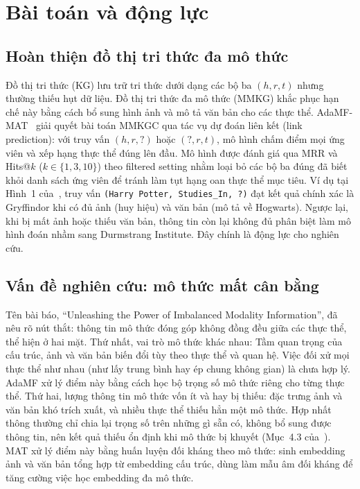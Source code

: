 \documentclass[conference]{IEEEtran}
\renewcommand{\hl}[1]{#1}
\renewcommand{\colorbox}[2]{#2}
\begin{document}
\section{Bài toán và động lực}
\label{sec:adamf-problem}

\subsection{Hoàn thiện đồ thị tri thức đa mô thức}
\hl{Đồ thị tri thức (KG) lưu trữ tri thức dưới dạng các bộ ba} \colorbox{yellow}{$(h, r, t)$}
\hl{nhưng thường thiếu hụt dữ liệu. Đồ thị tri thức đa mô thức (MMKG) khắc phục hạn chế này bằng cách bổ sung
hình ảnh và mô tả văn bản cho các thực thể. AdaMF-MAT}\colorbox{yellow}{~\cite{adamfmat}}\hl{ giải quyết bài toán
MMKGC qua tác vụ dự đoán liên kết (link prediction): với truy vấn} \colorbox{yellow}{$(h, r, ?)$} \hl{hoặc}
\colorbox{yellow}{$(?, r, t)$}\hl{, mô hình chấm điểm mọi ứng viên và xếp hạng thực thể đúng lên đầu. Mô hình được
đánh giá qua MRR và Hits@}\colorbox{yellow}{$k$} \hl{(}\colorbox{yellow}{$k \in \{1, 3, 10\}$}\hl{) theo filtered
setting nhằm loại bỏ các bộ ba đúng đã biết khỏi danh sách ứng viên để tránh làm tụt hạng oan thực thể mục tiêu.
Ví dụ tại Hình~1 của}\colorbox{yellow}{~\cite{adamfmat}}\hl{, truy vấn}
\colorbox{yellow}{\texttt{(Harry Potter, Studies\_In, ?)}}
\hl{đạt kết quả chính xác là Gryffindor khi có đủ ảnh (huy hiệu) và văn bản (mô tả về Hogwarts). Ngược lại, khi bị
mất ảnh hoặc thiếu văn bản, thông tin còn lại không đủ phân biệt làm mô hình đoán nhầm sang Durmstrang Institute.
Đây chính là động lực cho nghiên cứu.}

\subsection{Vấn đề nghiên cứu: mô thức mất cân bằng}
\hl{Tên bài báo, ``Unleashing the Power of Imbalanced Modality Information'', đã nêu rõ nút thắt: thông tin mô thức
đóng góp không đồng đều giữa các thực thể, thể hiện ở hai mặt. Thứ nhất, vai trò mô thức khác nhau: Tầm quan trọng
của cấu trúc, ảnh và văn bản biến đổi tùy theo thực thể và quan hệ. Việc đối xử mọi thực thể như nhau (như lấy
trung bình hay ép chung không gian) là chưa hợp lý. AdaMF xử lý điểm này bằng cách học bộ trọng số mô thức riêng
cho từng thực thể. Thứ hai, lượng thông tin mô thức vốn ít và hay bị thiếu: đặc trưng ảnh và văn bản khó trích
xuất, và nhiều thực thể thiếu hẳn một mô thức. Hợp nhất thông thường chỉ chia lại trọng số trên những gì sẵn có,
không bổ sung được thông tin, nên kết quả thiếu ổn định khi mô thức bị khuyết (Mục~4.3 của}\colorbox{yellow}{~\cite{adamfmat}}\hl{).
MAT xử lý điểm này bằng huấn luyện đối kháng theo mô thức: sinh embedding ảnh và văn bản tổng hợp từ embedding cấu
trúc, dùng làm mẫu âm đối kháng để tăng cường việc học embedding đa mô thức.}
\end{document}
